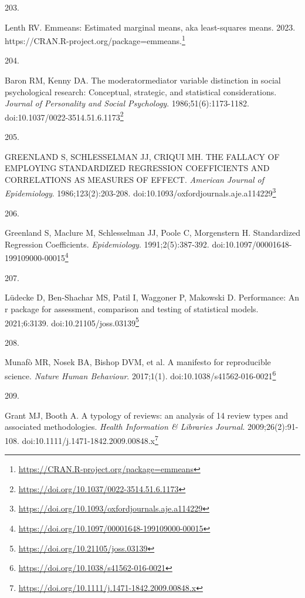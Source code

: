 \documentclass[
  a4paper,
]{book}
\newlength{\cslhangindent}
\newlength{\csllabelwidth}
\newlength{\cslentryspacingunit} %
\newenvironment{CSLReferences}[2] %
 {%
  \setlength{\parindent}{0pt}
  \ifodd #1
  \let\oldpar\par
  \def\par{\hangindent=\cslhangindent\oldpar}
  \fi
  \setlength{\parskip}{#2\cslentryspacingunit}
 }%
 {}
\newcommand{\CSLLeftMargin}[1]{\parbox[t]{\csllabelwidth}{#1}}
\newcommand{\CSLRightInline}[1]{\parbox[t]{\linewidth - \csllabelwidth}{#1}\break}
\renewcommand{\href}[2]{#2\footnote{\url{#1}}}
\begin{document}
\begin{CSLReferences}{0}{0}
\leavevmode{}%
\CSLLeftMargin{203. }%
\CSLRightInline{Lenth RV. Emmeans: Estimated marginal means, aka least-squares means. 2023. \href{https://CRAN.R-project.org/package=emmeans}{https://CRAN.R-project.org/package=emmeans.}}

\leavevmode{}%
\CSLLeftMargin{204. }%
\CSLRightInline{Baron RM, Kenny DA. The moderator{\textendash}mediator variable distinction in social psychological research: Conceptual, strategic, and statistical considerations. \emph{Journal of Personality and Social Psychology}. 1986;51(6):1173-1182. doi:\href{https://doi.org/10.1037/0022-3514.51.6.1173}{10.1037/0022-3514.51.6.1173}}

\leavevmode{}%
\CSLLeftMargin{205. }%
\CSLRightInline{GREENLAND S, SCHLESSELMAN JJ, CRIQUI MH. THE FALLACY OF EMPLOYING STANDARDIZED REGRESSION COEFFICIENTS AND CORRELATIONS AS MEASURES OF EFFECT. \emph{American Journal of Epidemiology}. 1986;123(2):203-208. doi:\href{https://doi.org/10.1093/oxfordjournals.aje.a114229}{10.1093/oxfordjournals.aje.a114229}}

\leavevmode{}%
\CSLLeftMargin{206. }%
\CSLRightInline{Greenland S, Maclure M, Schlesselman JJ, Poole C, Morgenstern H. Standardized Regression Coefficients. \emph{Epidemiology}. 1991;2(5):387-392. doi:\href{https://doi.org/10.1097/00001648-199109000-00015}{10.1097/00001648-199109000-00015}}

\leavevmode{}%
\CSLLeftMargin{207. }%
\CSLRightInline{Lüdecke D, Ben-Shachar MS, Patil I, Waggoner P, Makowski D. {\textbraceleft}Performance{\textbraceright}: An {\textbraceleft}r{\textbraceright} package for assessment, comparison and testing of statistical models. 2021;6:3139. doi:\href{https://doi.org/10.21105/joss.03139}{10.21105/joss.03139}}

\leavevmode{}%
\CSLLeftMargin{208. }%
\CSLRightInline{Munafò MR, Nosek BA, Bishop DVM, et al. A manifesto for reproducible science. \emph{Nature Human Behaviour}. 2017;1(1). doi:\href{https://doi.org/10.1038/s41562-016-0021}{10.1038/s41562-016-0021}}

\leavevmode{}%
\CSLLeftMargin{209. }%
\CSLRightInline{Grant MJ, Booth A. A typology of reviews: an analysis of 14 review types and associated methodologies. \emph{Health Information \& Libraries Journal}. 2009;26(2):91-108. doi:\href{https://doi.org/10.1111/j.1471-1842.2009.00848.x}{10.1111/j.1471-1842.2009.00848.x}}


\end{CSLReferences}
\end{document}
